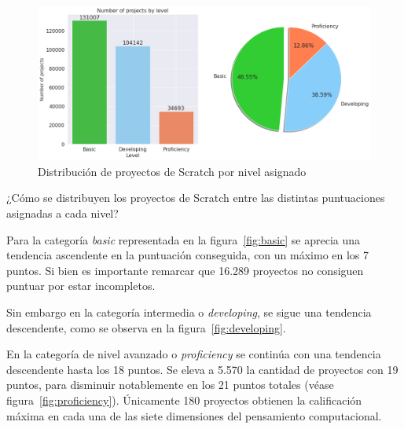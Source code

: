 \documentclass[a4paper, 12pt]{book}
\begin{document}
\begin{figure}[H]
    \centering
    \includegraphics[width=1.0\textwidth]{img/freq_level_Scratch.png}
    \caption{Distribución de proyectos de Scratch por nivel asignado}\label{fig:level_Scratch}
\end{figure}

¿Cómo se distribuyen los proyectos de Scratch entre las distintas puntuaciones asignadas a cada nivel?

Para la categoría \emph{basic} representada en la figura~\ref{fig:basic} se aprecia una tendencia ascendente en la puntuación conseguida, con un máximo en los 7 puntos. Si bien es importante remarcar que 16.289 proyectos no consiguen puntuar por estar incompletos.

Sin embargo en la categoría intermedia o \emph{developing}, se sigue una tendencia descendente, como se observa en la figura~\ref{fig:developing}.

En la categoría de nivel avanzado o \emph{proficiency} se continúa con una tendencia descendente hasta los 18 puntos. Se eleva a 5.570 la cantidad de proyectos con 19 puntos, para disminuir notablemente en los 21 puntos totales (véase figura~\ref{fig:proficiency}). Únicamente 180 proyectos obtienen la calificación máxima en cada una de las siete dimensiones del pensamiento computacional. 
\end{document}
